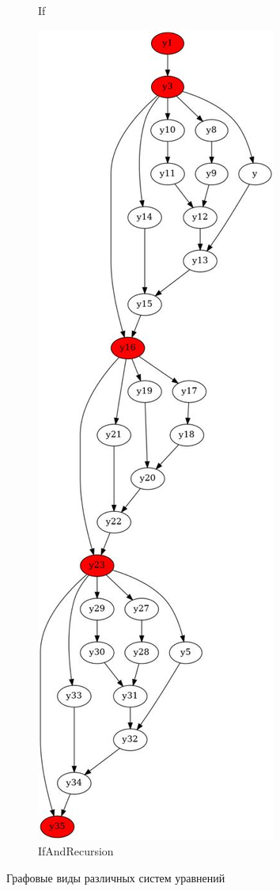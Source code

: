 \documentclass[../diploma.tex]{subfiles}
\begin{document}
\begin{figure}[h]
\begin{subfigure}{0.24\textwidth}
    \caption{If}
    \end{subfigure}
    \begin{subfigure}{0.24\textwidth}
    \includegraphics[width=0.9\linewidth]{graph_simple2.jpeg}
    \caption{IfAndRecursion}
    \end{subfigure}
    \captionsetup{justification = centering,
    singlelinecheck = false}
    \caption{Графовые виды различных систем уравнений}
    \label{all_graphs}
\end{figure}
\end{document}
